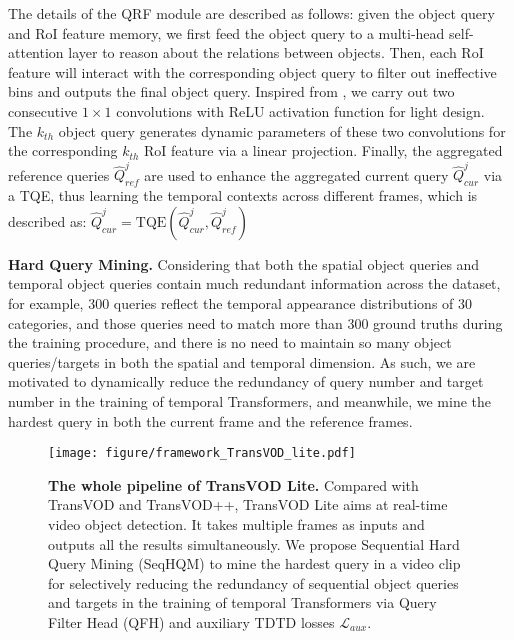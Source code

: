 \documentclass[10pt,journal,compsoc]{IEEEtran}
\begin{document}
The details of the QRF module are described as follows: given the object query and RoI feature memory, we first feed the object query to a multi-head self-attention layer to reason about the relations between objects. Then, each RoI feature will interact with the corresponding object query to filter out ineffective bins and outputs the final object query. Inspired from \cite{sun2021sparse}, we carry out two consecutive $1 \times 1$ convolutions with ReLU activation function for light design. 
The $k_{th}$ object query generates dynamic parameters of these two convolutions for the corresponding $k_{th}$ RoI feature via a linear projection.
Finally, the aggregated reference queries $\hat{Q}^{j}_{ref}$ are used to enhance the aggregated current query $\hat{Q}^{j}_{cur}$ via a TQE, thus learning the temporal contexts across different frames, which is described as: $\hat{Q}^{j}_{cur} = \text{TQE}(\hat{Q}^{j}_{cur}, \hat{Q}^{j}_{ref})$


\noindent
\textbf{Hard Query Mining.}
Considering that both the spatial object queries and temporal object queries contain much redundant information across the dataset, for example, 300 queries reflect the temporal appearance distributions of 30 categories, and those queries need to match more than 300 ground truths during the training procedure, and there is no need to maintain so many object queries/targets in both the spatial and temporal dimension. As such, we are motivated to dynamically reduce the redundancy of query number and target number in the training of temporal Transformers, and meanwhile, we mine the hardest query in both the current frame and the reference frames.

\begin{figure*}[h]
    \centering
    \texttt{[image: figure/framework\_TransVOD\_lite.pdf]} 
    \vspace{-6mm}
    \caption{\small \textbf{The whole pipeline of TransVOD Lite.} Compared with TransVOD and TransVOD++, TransVOD Lite aims at real-time video object detection. It takes multiple frames as inputs and outputs all the results simultaneously. We propose Sequential Hard Query Mining (SeqHQM) to mine the hardest query in a video clip for selectively reducing the redundancy of sequential object queries and targets in the training of temporal Transformers via Query Filter Head (QFH) and auxiliary TDTD losses $\mathcal{L}_{aux}$. }
    \vspace{-5mm}
    \label{fig:framework_tranvod_lite}
\end{figure*}
\end{document}

